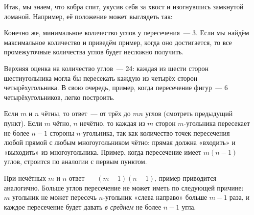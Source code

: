 
\begin{itemize}
\itA Итак, мы знаем, что кобра спит, укусив себя за хвост и изогнувшись замкнутой ломаной. Например, её положение может выглядеть так:

\begin{center}  \end{center}

\itB Конечно же, минимальное количество углов у пересечения~— 3. Если мы найдём максимальное количество и приведём пример, когда оно достигается, то все промежуточные количества углов будет несложно получить.

Верхняя оценка на количество углов~— 24: каждая из шести сторон шестиугольника могла бы пересекать каждую из четырёх сторон четырёхугольника. В свою очередь, пример, когда пересечение фигур~— 6 четырёхугольников, легко построить.

\itC Если $m$ и $n$ чётны, то ответ~— от трёх до $mn$ углов (смотреть предыдущий пункт). Если $m$ чётно, $n$ нечётно, то каждая из $m$ сторон $m$-угольника пересекает не более $n-1$ стороны $n$-угольника, так как количество точек пересечения любой прямой с любым многоугольником чётно: прямая должна «входить» и «выходить» из многоугольника. Пример, когда пересечение имеет $m(n-1)$ углов, строится по аналогии с первым пунктом.

При нечётных $m$ и $n$ ответ~— $(m-1)(n-1)$, пример приводится аналогично. Больше углов пересечение не может иметь по следующей причине: $m$ угольник не может пересечь $n$-угольник «слева направо» больше $m-1$ раза, и каждое пересечение будет давать {\itshape в среднем} не более $n-1$ угла.
\end{itemize}